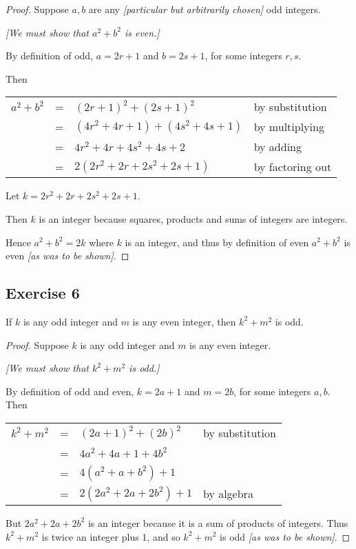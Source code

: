 \documentclass[14pt]{extarticle}
\newcommand{\cy}{\color{cyan}}
\begin{document}
\begin{proof}
    Suppose $a,b$ are any {\it [particular but arbitrarily chosen]} odd integers.

        {\it [We must show that $a^2+b^2$ is even.]}

    By definition of odd, $a = 2r+1$ and $b = 2s+1$, for some integers $r,s$.

    Then

    \begin{center}
        \begin{tabular}{rcll}
            $a^2+b^2$ & = & $(2r+1)^2 + (2s+1)^2$               & \cy by substitution  \\
                      & = & $(4r^2 + 4r + 1) + (4s^2 + 4s + 1)$ & \cy by multiplying   \\
                      & = & $4r^2 + 4r + 4s^2 + 4s + 2$         & \cy by adding        \\
                      & = & $2(2r^2+2r+2s^2+2s+1)$              & \cy by factoring out \\
        \end{tabular}
    \end{center}

    Let $k = 2r^2+2r+2s^2+2s+1$.

    Then $k$ is an integer because squares, products and sums of integers are integers.

    Hence $a^2+b^2 = 2k$ where $k$ is an integer, and thus by definition of even $a^2+b^2$ is even {\it [as was to be shown]}.
\end{proof}

\subsection{Exercise 6}
If $k$ is any odd integer and $m$ is any even integer, then $k^2 + m^2$ is odd.

\begin{proof}
    Suppose $k$ is any odd integer and $m$ is any even integer.

        {\it [We must show that $k^2 + m^2$ is odd.]}

    By definition of odd and even, $k = 2a+1$ and $m = 2b$, for some integers $a, b$. Then

    \begin{center}
        \begin{tabular}{rcll}
            $k^2+m^2$ & = & $(2a+1)^2+(2b)^2$   & \cy by substitution \\
                      & = & $4a^2+4a+1+4b^2$    &                     \\
                      & = & $4(a^2+a+b^2)+1$    &                     \\
                      & = & $2(2a^2+2a+2b^2)+1$ & \cy by algebra      \\
        \end{tabular}
    \end{center}

    But $2a^2+2a+2b^2$ is an integer because it is a sum of products of integers. Thus $k^2+m^2$ is twice an integer plus 1, and so $k^2+m^2$ is odd {\it [as was to be shown]}.
\end{proof}
\end{document}
